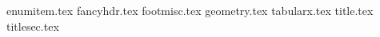 {enumitem.tex}
{fancyhdr.tex}
{footmisc.tex}
{geometry.tex}
{tabularx.tex}
{title.tex}
{titlesec.tex}